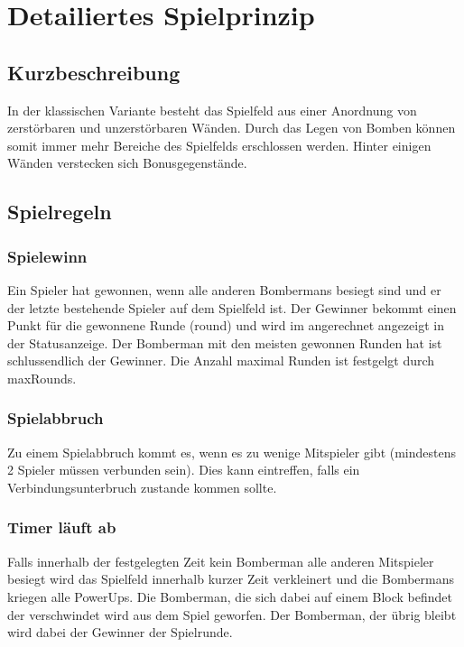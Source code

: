 \documentclass[11pt]{scrartcl}
\begin{document}
\newpage
\section{Detailiertes Spielprinzip}
\label{sec:Detailiertes Spielprinzip}
\subsection{Kurzbeschreibung}
\label{Kurzbeschreibung}
In der klassischen Variante besteht das Spielfeld aus einer Anordnung 
von zerstörbaren und unzerstörbaren Wänden. 
Durch das Legen von Bomben können somit immer mehr 
Bereiche des Spielfelds erschlossen werden. Hinter einigen 
Wänden verstecken sich Bonusgegenstände.\cite{Bomberman Spielprinzip}

\subsection{Spielregeln}
\label{sec:Spielregeln}

\subsubsection{Spielewinn}
\label{sec:Spielgewinn}
Ein Spieler hat gewonnen, wenn alle anderen Bombermans besiegt sind und er der letzte bestehende Spieler auf dem Spielfeld ist.
Der Gewinner bekommt einen Punkt für die gewonnene Runde (round) und wird im angerechnet angezeigt in der Statusanzeige.
Der Bomberman mit den meisten gewonnen Runden hat ist schlussendlich der Gewinner.
Die Anzahl maximal Runden ist festgelgt durch maxRounds.

\subsubsection{Spielabbruch}
\label{sec:Spielabbruch}
Zu einem Spielabbruch kommt es, wenn es zu wenige Mitspieler gibt (mindestens 2 Spieler müssen verbunden sein).
Dies kann eintreffen, falls ein Verbindungsunterbruch zustande kommen sollte.

\subsubsection{Timer läuft ab}
\label{sec:Timer läuft ab}
Falls innerhalb der festgelegten Zeit kein Bomberman alle anderen Mitspieler besiegt wird das Spielfeld innerhalb kurzer Zeit verkleinert und die Bombermans kriegen alle PowerUps.
Die Bomberman, die sich dabei auf einem Block befindet der \grqq{}verschwindet\grqq{} wird aus dem Spiel geworfen.
Der Bomberman, der übrig bleibt wird dabei der Gewinner der Spielrunde.
\end{document}
